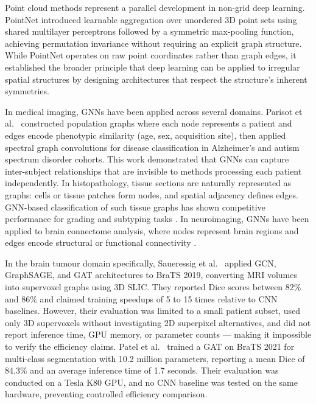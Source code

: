 \documentclass{article}
\begin{document}
Point cloud methods represent a parallel development in non-grid deep learning.
PointNet \cite{qi2017pointnet} introduced learnable aggregation over
unordered 3D point sets using shared multilayer perceptrons followed by a
symmetric max-pooling function, achieving permutation invariance without
requiring an explicit graph structure. While PointNet operates on raw point
coordinates rather than graph edges, it established the broader principle that
deep learning can be applied to irregular spatial structures by designing
architectures that respect the structure's inherent symmetries.

In medical imaging, GNNs have been applied across several domains. Parisot
et al.\ \cite{parisot2017spectral} constructed population graphs where each
node represents a patient and edges encode phenotypic similarity (age, sex,
acquisition site), then applied spectral graph convolutions for disease
classification in Alzheimer's and autism spectrum disorder cohorts. This work
demonstrated that GNNs can capture inter-subject relationships that are
invisible to methods processing each patient independently. In histopathology,
tissue sections are naturally represented as graphs: cells or tissue patches
form nodes, and spatial adjacency defines edges. GNN-based classification of
such tissue graphs has shown competitive performance for grading and subtyping
tasks \cite{jha2021instance}. In neuroimaging, GNNs have been applied to
brain connectome analysis, where nodes represent brain regions and edges
encode structural or functional connectivity \cite{bessadok2022graph}.

In the brain tumour domain specifically, Saueressig et al.\
\cite{saueressig2021exploring} applied GCN, GraphSAGE, and GAT architectures
to BraTS 2019, converting MRI volumes into supervoxel graphs using 3D SLIC.
They reported Dice scores between 82\% and 86\% and claimed training speedups
of 5 to 15 times relative to CNN baselines. However, their evaluation was
limited to a small patient subset, used only 3D supervoxels without
investigating 2D superpixel alternatives, and did not report inference time,
GPU memory, or parameter counts --- making it impossible to verify the
efficiency claims. Patel et al.\ \cite{patel2023multiclass} trained a GAT
on BraTS 2021 for multi-class segmentation with 10.2 million parameters,
reporting a mean Dice of 84.3\% and an average inference time of 1.7 seconds.
Their evaluation was conducted on a Tesla K80 GPU, and no CNN baseline was
tested on the same hardware, preventing controlled efficiency comparison.
\end{document}
